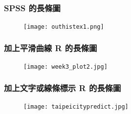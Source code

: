 \documentclass{beamer}
\begin{document}
\begin{frame}\frametitle{SPSS 的長條圖}
\begin{figure}
\begin{center}
\texttt{[image: outhistex1.png]}
\end{center}
\end{figure}
\end{frame}
\begin{frame}\frametitle{加上平滑曲線 R 的長條圖}
\begin{figure}
\begin{center}
\texttt{[image: week3\_plot2.jpg]}
\end{center}
\end{figure}
\end{frame}
\begin{frame}\frametitle{加上文字或線條標示 R 的長條圖}
\begin{figure}
\begin{center}
\texttt{[image: taipeicitypredict.jpg]}
\end{center}
\end{figure}
\end{frame}
\end{document}
